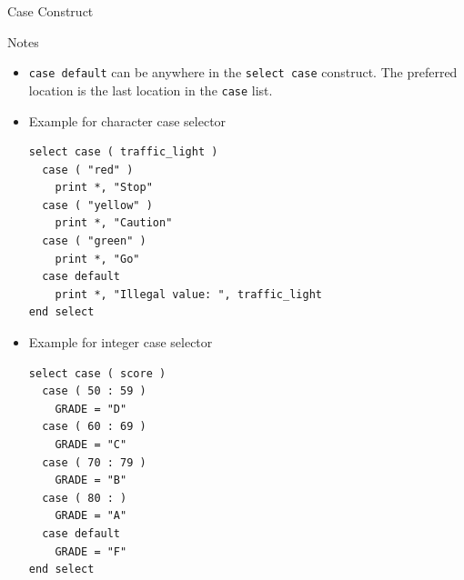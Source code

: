 \documentclass[c,mathserif,compress,xcolor=svgnames]{beamer}
\newcommand{\lstfortran}[1]{\lstinline[language={[90]Fortran},basicstyle=\footnotesize\ttfamily]|#1|}
\newenvironment{ablock}[0]
{
\begin{beamerboxesrounded}[upper=uppercol,lower=lowercol,shadow=true]}
{\end{beamerboxesrounded}}
\begin{document}
\begin{frame}{Case Construct}
\begin{ablock}{Notes}
\begin{itemize}
      \item \lstfortran{case default} can be anywhere in the \lstfortran{select case} construct. The preferred location is the last location in the \lstfortran{case} list.
    \end{itemize}
  \end{ablock}
  \framebreak
  \begin{itemize}
    \item Example for character case selector
      \begin{lstlisting}[language={[90]Fortran},basicstyle=\fontsize{6}{7}\selectfont\ttfamily]
select case ( traffic_light )
  case ( "red" )
    print *, "Stop"
  case ( "yellow" )
    print *, "Caution"
  case ( "green" )
    print *, "Go"
  case default
    print *, "Illegal value: ", traffic_light
end select 
      \end{lstlisting}
    \item Example for integer case selector
      \begin{lstlisting}[language={[90]Fortran},basicstyle=\fontsize{6}{7}\selectfont\ttfamily]
select case ( score )
  case ( 50 : 59 )
    GRADE = "D"
  case ( 60 : 69 )
    GRADE = "C"
  case ( 70 : 79 )
    GRADE = "B"
  case ( 80 : ) 
    GRADE = "A"
  case default
    GRADE = "F"
end select
      \end{lstlisting}
  \end{itemize}
\end{frame}
\end{document}
